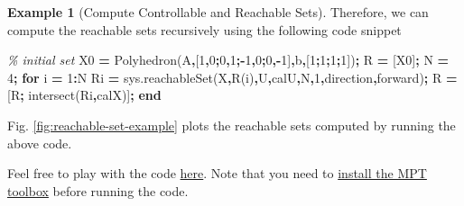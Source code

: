 \documentclass[
]{book}
\newenvironment{Shaded}{\begin{snugshade}}{\end{snugshade}}
\newcommand{\CommentTok}[1]{\textcolor[rgb]{0.56,0.35,0.01}{\textit{#1}}}
\newcommand{\FloatTok}[1]{\textcolor[rgb]{0.00,0.00,0.81}{#1}}
\newcommand{\KeywordTok}[1]{\textcolor[rgb]{0.13,0.29,0.53}{\textbf{#1}}}
\newcommand{\NormalTok}[1]{#1}
\newcommand{\OperatorTok}[1]{\textcolor[rgb]{0.81,0.36,0.00}{\textbf{#1}}}
\newcommand{\SpecialStringTok}[1]{\textcolor[rgb]{0.31,0.60,0.02}{#1}}
\newcommand{\VariableTok}[1]{\textcolor[rgb]{0.00,0.00,0.00}{#1}}
\theoremstyle{definition}
\theoremstyle{definition}
\newtheorem{example}{Example}[chapter]
\theoremstyle{definition}
\theoremstyle{definition}
\theoremstyle{remark}
\begin{document}
\begin{example}[Compute Controllable and Reachable Sets]
Therefore, we can compute the reachable sets recursively using the following code snippet

\begin{Shaded}
\begin{Highlighting}[]
\CommentTok{\% initial set}
\VariableTok{X0} \OperatorTok{=} \VariableTok{Polyhedron}\NormalTok{(}\SpecialStringTok{\textquotesingle{}A\textquotesingle{}}\OperatorTok{,}\NormalTok{[}\FloatTok{1}\OperatorTok{,}\FloatTok{0}\OperatorTok{;}\FloatTok{0}\OperatorTok{,}\FloatTok{1}\OperatorTok{;{-}}\FloatTok{1}\OperatorTok{,}\FloatTok{0}\OperatorTok{;}\FloatTok{0}\OperatorTok{,{-}}\FloatTok{1}\NormalTok{]}\OperatorTok{,}\SpecialStringTok{\textquotesingle{}b\textquotesingle{}}\OperatorTok{,}\NormalTok{[}\FloatTok{1}\OperatorTok{;}\FloatTok{1}\OperatorTok{;}\FloatTok{1}\OperatorTok{;}\FloatTok{1}\NormalTok{])}\OperatorTok{;}
\VariableTok{R} \OperatorTok{=}\NormalTok{ [}\VariableTok{X0}\NormalTok{]}\OperatorTok{;}
\VariableTok{N} \OperatorTok{=} \FloatTok{4}\OperatorTok{;}
\KeywordTok{for} \VariableTok{i} \OperatorTok{=} \FloatTok{1}\OperatorTok{:}\VariableTok{N}
    \VariableTok{Ri} \OperatorTok{=} \VariableTok{sys}\NormalTok{.}\VariableTok{reachableSet}\NormalTok{(}\SpecialStringTok{\textquotesingle{}X\textquotesingle{}}\OperatorTok{,}\VariableTok{R}\NormalTok{(}\VariableTok{i}\NormalTok{)}\OperatorTok{,}\SpecialStringTok{\textquotesingle{}U\textquotesingle{}}\OperatorTok{,}\VariableTok{calU}\OperatorTok{,}\SpecialStringTok{\textquotesingle{}N\textquotesingle{}}\OperatorTok{,}\FloatTok{1}\OperatorTok{,}\SpecialStringTok{\textquotesingle{}direction\textquotesingle{}}\OperatorTok{,}\SpecialStringTok{\textquotesingle{}forward\textquotesingle{}}\NormalTok{)}\OperatorTok{;}
    \VariableTok{R} \OperatorTok{=}\NormalTok{ [}\VariableTok{R}\OperatorTok{;} \VariableTok{intersect}\NormalTok{(}\VariableTok{Ri}\OperatorTok{,}\VariableTok{calX}\NormalTok{)]}\OperatorTok{;}
\KeywordTok{end}
\end{Highlighting}
\end{Shaded}

Fig. \ref{fig:reachable-set-example} plots the reachable sets computed by running the above code.

Feel free to play with the code \href{https://github.com/ComputationalRobotics/OptimalControlEstimation-Examples/blob/main/mpt_examples/controllable_reachable_sets.m}{here}. Note that you need to \href{https://www.mpt3.org/Main/Installation}{install the MPT toolbox} before running the code.

\begin{figure}


\end{figure}
\end{example}
\end{document}
